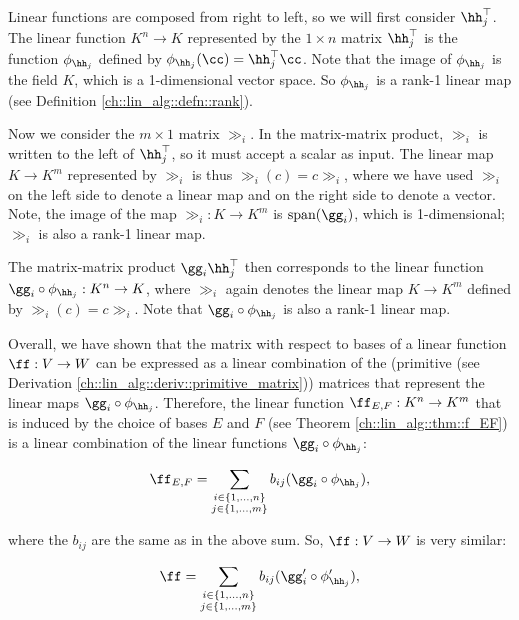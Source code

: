Linear functions are composed from right to left, so we will first consider $\hh_j^\top$. The linear function $K^n \rightarrow K$ represented by the $1 \times n$ matrix $\hh_j^\top$ is the function $\phi_{\hh_j}$ defined by $\phi_{\hh_j}(\cc) = \hh_j^\top \cc$. Note that the image of $\phi_{\hh_j}$ is the field $K$, which is a 1-dimensional vector space. So $\phi_{\hh_j}$ is a rank-1 linear map (see Definition \ref{ch::lin_alg::defn::rank}).

Now we consider the $m \times 1$ matrix $\gg_i$. In the matrix-matrix product, $\gg_i$ is written to the left of $\hh_j^\top$, so it must accept a scalar as input. The linear map $K \rightarrow K^m$ represented by $\gg_i$ is thus $\gg_i(c) = c \gg_i$, where we have used $\gg_i$ on the left side to denote a linear map and on the right side to denote a vector. Note, the image of the map $\gg_i:K \rightarrow K^m$ is $\spann(\gg_i)$, which is 1-dimensional; $\gg_i$ is also a rank-1 linear map.

The matrix-matrix product $\gg_i \hh_j^\top$ then corresponds to the linear function $\gg_i \circ \phi_{\hh_j}:K^n \rightarrow K$, where $\gg_i$ again denotes the linear map $K \rightarrow K^m$ defined by $\gg_i(c) = c \gg_i$. Note that  $\gg_i \circ \phi_{\hh_j}$ is also a rank-1 linear map.

Overall, we have shown that the matrix with respect to bases of a linear function $\ff:V \rightarrow W$ can be expressed as a linear combination of the (primitive (see Derivation \ref{ch::lin_alg::deriv::primitive_matrix})) matrices that represent the linear maps $\gg_i \circ \phi_{\hh_j}$. Therefore, the linear function $\ff_{E,F}:K^n \rightarrow K^m$ that is induced by the choice of bases $E$ and $F$ (see Theorem \ref{ch::lin_alg::thm::f_EF}) is a linear combination of the linear functions $\gg_i \circ \phi_{\hh_j}$:

\begin{align*}
    \ff_{E, F} = \sum_{\substack{i \in \{1, ..., n\} \\ j \in \{1, ..., m\}}} b_{ij} (\gg_i \circ \phi_{\hh_j}),
\end{align*}

where the $b_{ij}$ are the same as in the above sum. So, $\ff:V \rightarrow W$ is very similar:

\begin{align*}
    \ff = \sum_{\substack{i \in \{1, ..., n\} \\ j \in \{1, ..., m\}}} b_{ij} (\gg_i' \circ \phi_{\hh_j}'),
\end{align*}

